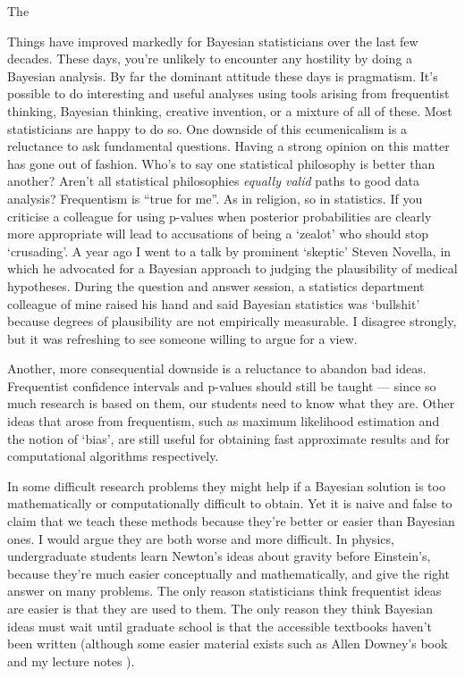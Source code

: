 \documentclass[a4paper, 12pt]{article}
\begin{document}
The 


Things have improved markedly for Bayesian statisticians over the last few
decades. These days, you're unlikely to encounter any hostility by doing
a Bayesian analysis. By far the dominant attitude these days
is pragmatism. It's possible to do interesting and useful analyses using tools
arising from frequentist thinking, Bayesian thinking, creative invention, or
a mixture of all of these. Most statisticians are happy to do so.
One downside of this ecumenicalism is a reluctance to ask fundamental
questions. Having a strong opinion on this matter has gone out of fashion.
Who's to say one statistical philosophy is better than
another? Aren't all statistical philosophies {\it equally valid} paths to good
data analysis? Frequentism is ``true for me''. As in religion, so in statistics.
If you criticise a colleague for using p-values when posterior probabilities
are clearly more appropriate will lead to accusations of being a `zealot'
\citep{simply_statistics} who should stop `crusading'.
A year ago I went to a talk by prominent `skeptic' Steven Novella, in which
he advocated for a Bayesian approach to judging the plausibility of medical
hypotheses. During the question and answer session, a statistics department colleague of mine raised his hand and said Bayesian statistics was `bullshit' because degrees of plausibility are not empirically measurable. I disagree
strongly, but it was refreshing to see someone willing to argue for a view.

Another, more consequential downside is a reluctance to abandon bad ideas.
Frequentist confidence intervals and p-values should still be taught
--- since so much research is based on them, our students need to know what
they are. Other ideas that arose from frequentism, such as maximum likelihood
estimation and the notion of `bias', are still useful for obtaining fast
approximate results and for computational algorithms respectively.

In some difficult research problems they might help if a Bayesian solution is too mathematically or computationally difficult to obtain.
Yet it is naive and false to claim that we teach these methods because they're
better or easier than Bayesian ones. I would argue they are both worse and
more difficult. In physics, undergraduate students learn Newton's ideas about
gravity before Einstein's, because they're much easier conceptually and
mathematically, and give the right answer on many problems. The only reason
statisticians think frequentist ideas are easier is that they are used to them.
The only reason they think Bayesian ideas must wait until graduate school is
that the accessible textbooks haven't been written (although some easier material
exists such as Allen Downey's book \citep{downey} and my lecture
notes \citep{331}).
\end{document}
